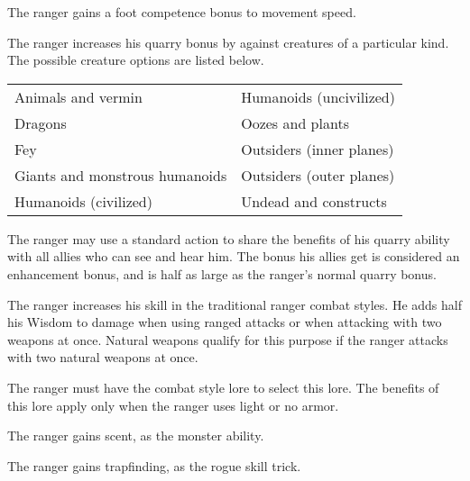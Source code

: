  The ranger gains a  foot competence bonus to movement speed.

 The ranger increases his quarry bonus by  against creatures of a particular kind. The possible creature options are listed below.

\begin{dtable}
\begin{tabularx}{\columnwidth}{X X}
Animals and vermin & Humanoids (uncivilized) \\
Dragons & Oozes and plants \\
Fey & Outsiders (inner planes) \\
Giants and monstrous humanoids & Outsiders (outer planes) \\
Humanoids (civilized)  & Undead and constructs \\
\end{tabularx}
\end{dtable}

 The ranger may use a standard action to share the benefits of his quarry ability with all allies who can see and hear him. The bonus his allies get is considered an enhancement bonus, and is half as large as the ranger's normal quarry bonus.

 The ranger increases his skill in the traditional ranger combat styles. He adds half his Wisdom to damage when using ranged attacks or when attacking with two weapons at once. Natural weapons qualify for this purpose if the ranger attacks with two natural weapons at once.

The ranger must have the combat style lore to select this lore. The benefits of this lore apply only when the ranger uses light or no armor.

 The ranger gains scent, as the monster ability.

 The ranger gains trapfinding, as the rogue skill trick.

\begin{comment}
\cf{Rgr}{Animal Companion (Ex)}:  At 4th level, a ranger gains an animal
companion selected from the following list: badger, camel, dire rat,
dog, riding dog, eagle, hawk, horse (light or heavy), owl, pony, snake
(Small or Medium viper), or wolf. If the campaign takes place
wholly or partly in an aquatic environment, the following creatures may be added
to the ranger's list of options: crocodile,
porpoise, Medium shark, and squid. This animal is a loyal
companion that accompanies the ranger on his adventures as
appropriate for its kind.

\par This ability functions like the druid ability of the same name (see \pref{Drd:Animal Companion (Ex)}), except that the ranger's effective druid level is equal to his ranger level \sub 3.
\par For example, the animal companion of an 8th-level
ranger would be the equivalent of a 5th-level druid's animal
companion.
\end{comment}


